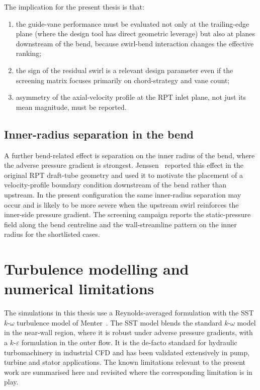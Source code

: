 The implication for the present thesis is that:
\begin{enumerate}
  \item the guide-vane performance must be evaluated not only at the trailing-edge plane (where the design tool has direct geometric leverage) but also at planes downstream of the bend, because swirl-bend interaction changes the effective ranking;
  \item the sign of the residual swirl is a relevant design parameter even if the screening matrix focuses primarily on chord-strategy and vane count;
  \item asymmetry of the axial-velocity profile at the RPT inlet plane, not just its mean magnitude, must be reported.
\end{enumerate}
 
\subsection{Inner-radius separation in the bend}
\label{sec:theory_bend_separation}
 
A further bend-related effect is separation on the inner radius of the bend, where the adverse pressure gradient is strongest. Jenssen~\cite{Jenssen2020} reported this effect in the original RPT draft-tube geometry and used it to motivate the placement of a velocity-profile boundary condition downstream of the bend rather than upstream. In the present configuration the same inner-radius separation may occur and is likely to be more severe when the upstream swirl reinforces the inner-side pressure gradient. The screening campaign reports the static-pressure field along the bend centreline and the wall-streamline pattern on the inner radius for the shortlisted cases.
 
\section{Turbulence modelling and numerical limitations}
\label{sec:theory_turbulence}
 
The simulations in this thesis use a Reynolds-averaged formulation with the SST $k$-$\omega$ turbulence model of Menter~\cite{Menter1994}. The SST model blends the standard $k$-$\omega$ model in the near-wall region, where it is robust under adverse pressure gradients, with a $k$-$\varepsilon$ formulation in the outer flow. It is the de-facto standard for hydraulic turbomachinery in industrial CFD and has been validated extensively in pump, turbine and stator applications. The known limitations relevant to the present work are summarised here and revisited where the corresponding limitation is in play.
 
